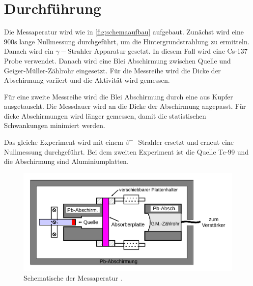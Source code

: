 \section{Durchführung}
\label{sec:Durchführung}
Die Messaperatur wird wie in \autoref{fig:schemaaufbau} aufgebaut. Zunächst wird eine $900 \unit{\second}$ lange Nullmessung durchgeführt, um die Hintergrundstrahlung zu ermitteln.
Danach wird ein $\gamma- \text{Strahler}$ Apparatur gesetzt. In diesem Fall wird eine Cs-137 Probe verwendet. Danach wird eine Blei Abschirmung zwischen Quelle und Geiger-Müller-Zählrohr eingesetzt. Für die Messreihe wird die Dicke der Abschirmung variiert und die Aktivität wird gemessen.

Für eine zweite Messreihe wird die Blei Abschirmung durch eine aus Kupfer ausgetauscht. Die Messdauer wird an die Dicke der Abschirmung angepasst. Für dicke Abschirmungen wird länger gemessen, damit die statistischen Schwankungen minimiert werden.

Das gleiche Experiment wird mit einem $\beta^{-}$- Strahler ersetzt und erneut eine Nullmessung durchgeführt. Bei dem zweiten Experiment ist die Quelle Tc-99 und die Abschirmung sind Aluminiumplatten.


\begin{figure}
    \centering
    \includegraphics{figures/abb4.pdf}
    \caption{Schematische der Messaperatur \cite{ap04}.} 
    \label{fig:schemaaufbau}
\end{figure}